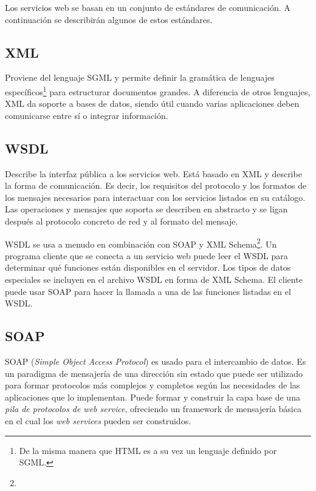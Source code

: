 \documentclass[conference]{IEEEtran}
\begin{document}
Los servicios web se basan en un conjunto de estándares de
comunicación. A continuación se describirán algunos de estos
estándares. 

\subsection{XML}
\label{sec:serv-soa-xml}

Proviene del lenguaje SGML y permite definir la gramática de lenguajes
específicos\footnote{De la misma manera que HTML es a su vez un lenguaje
definido por SGML.} para estructurar documentos grandes. A diferencia
de otros lenguajes, XML da soporte a bases de datos, siendo útil
cuando varias aplicaciones deben comunicarse entre sí o integrar
información.

\subsection{WSDL}
\label{sec:serv-soa-wsdl}

Describe la interfaz pública a los servicios web. Está basado en XML y
describe la forma de comunicación. Es decir, los requisitos del
protocolo y los formatos de los mensajes necesarios para interactuar
con los servicios listados en su catálogo. Las operaciones y mensajes
que soporta se describen en abstracto y se ligan después al protocolo
concreto de red y al formato del mensaje.

WSDL se usa a menudo en combinación con SOAP y XML
Schema\footnote{}. Un
programa cliente que se conecta a un servicio web puede leer el WSDL
para determinar qué funciones están disponibles en el servidor. Los
tipos de datos especiales se incluyen en el archivo WSDL en forma de
XML Schema. El cliente puede usar SOAP para hacer la llamada a una de
las funciones listadas en el WSDL.

\subsection{SOAP}
\label{sec:serv-soa-soap}

SOAP (\textsl{Simple Object Access Protocol}) es usado para el
intercambio de datos.
Es un paradigma de mensajería de una dirección sin estado que puede
ser utilizado para formar protocolos más complejos y completos según
las necesidades de las aplicaciones que lo implementan. Puede formar y
construir la capa base de una \emph{pila de protocolos de web service},
ofreciendo un framework de mensajería básica en el cual los \emph{web
services} pueden ser construidos.
\end{document}
